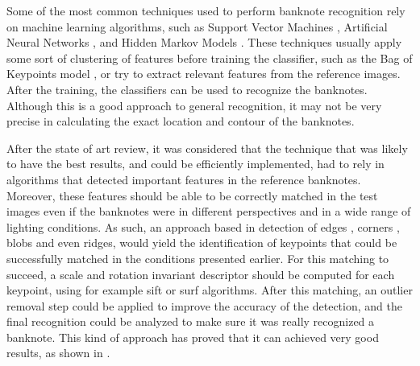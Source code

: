 Some of the most common techniques used to perform banknote recognition rely on machine learning algorithms, such as Support Vector Machines \iftoggle{ebib}{\cite{Yeh2011,Chang2007,Sun2008A}}{\cite{Yeh2011}}, Artificial Neural Networks \iftoggle{ebib}{\cite{Lee2004,Gai2013,Sun2008B}}{\cite{Gai2013}}, and Hidden Markov Models \iftoggle{ebib}{\cite{Hassanpour2009,Shan2009}}{\cite{Hassanpour2009}}. These techniques usually apply some sort of clustering of features before training the classifier, such as the Bag of Keypoints model \cite{Csurka2004}, or try to extract relevant features from the reference images. After the training, the classifiers can be used to recognize the banknotes. Although this is a good approach to general recognition, it may not be very precise in calculating the exact location and contour of the banknotes.

After the state of art review, it was considered that the technique that was likely to have the best results, and could be efficiently implemented, had to rely in algorithms that detected important features in the reference banknotes. Moreover, these features should be able to be correctly matched in the test images even if the banknotes were in different perspectives and in a wide range of lighting conditions. As such, an approach based in detection of edges \cite{Shi1994}, corners \cite{Rosten2006}, blobs \cite{Matas2004} and even ridges, would yield the identification of keypoints that could be successfully matched in the conditions presented earlier. For this matching to succeed, a scale and rotation invariant descriptor should be computed for each keypoint, using for example \gls{sift} \cite{Lowe2004} or \gls{surf} \cite{Bay2006} algorithms. After this matching, an outlier removal step could be applied to improve the accuracy of the detection, and the final recognition could be analyzed to make sure it was really recognized a banknote. This kind of approach has proved that it can achieved very good results, as shown in \iftoggle{ebib}{\cite{Hasanuzzaman2011,Hasanuzzaman2012,Toytman2011}}{\cite{Hasanuzzaman2012}}.
